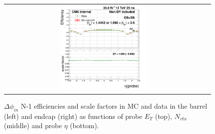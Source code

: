 \begin{figure}[bh]
\begin{center}
\begin{tabular}{cc}
      \includegraphics[width=0.45\textwidth]{figures/Zprime/2016/ScaleFactor/SameSign/N_1_eff/g_compare_cut_eta_Barrel+Endcap_ea_ta_inc_AS_N_1_DPhiIn_PUW.png}
    \end{tabular}
    \caption{$\Delta \phi_{in}$ N-1 efficiencies and scale factors in MC and data in the barrel (left) and endcap (right) as functions of probe $E_T$ (top), $N_{vtx}$ (middle) and probe $\eta$ (bottom).}
    \label{fig:DPhiIn_2016}
  \end{center}
\end{figure}

